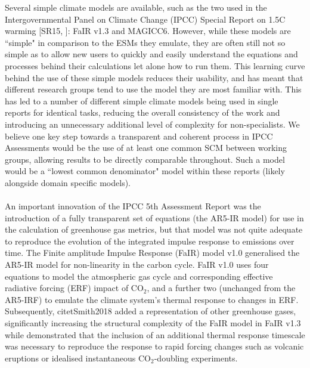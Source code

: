 \documentclass[gmd, manuscript]{copernicus}
\begin{document}
Several simple climate models are available, such as the two used in the Intergovernmental Panel on Climate Change (IPCC) Special Report on 1.5\textdegree C warming [SR15, \cite{IPCC2018}]: FaIR v1.3 and MAGICC6. However, while these models are ``simple" in comparison to the ESMs they emulate, they are often still not so simple as to allow new users to quickly and easily understand the equations and processes behind their calculations let alone how to run them. This learning curve behind the use of these simple models reduces their usability, and has meant that different research groups tend to use the model they are most familiar with. This has led to a number of different simple climate models being used in single reports for identical tasks, reducing the overall consistency of the work and introducing an unnecessary additional level of complexity for non-specialists. We believe one key step towards a transparent and coherent process in IPCC Assessments would be the use of at least one common SCM between working groups, allowing results to be directly comparable throughout. Such a model would be a ``lowest common denominator" model within these reports (likely alongside domain specific models).\\\\
An important innovation of the IPCC 5th Assessment Report \citep{Myhre2013a} was the introduction of a fully transparent set of equations (the AR5-IR model) for use in the calculation of greenhouse gas metrics, but that model was not quite adequate to reproduce the evolution of the integrated impulse response to emissions over time. The Finite amplitude Impulse Response (FaIR) model v1.0 \citep{Millar2016} generalised the AR5-IR model for non-linearity in the carbon cycle. FaIR v1.0 uses four equations to model the atmospheric gas cycle and corresponding effective radiative forcing (ERF) impact of CO$_2$, and a further two (unchanged from the AR5-IRF) to emulate the climate system's thermal response to changes in ERF. Subsequently, citet{Smith2018} added a representation of other greenhouse gases, significantly increasing the structural complexity of the FaIR model in FaIR v1.3 while \citet{Tsutsui2017} demonstrated that the inclusion of an additional thermal response timescale was necessary to reproduce the response to rapid forcing changes such as volcanic eruptions or idealised instantaneous CO$_2$-doubling experiments.\\\\
\end{document}
